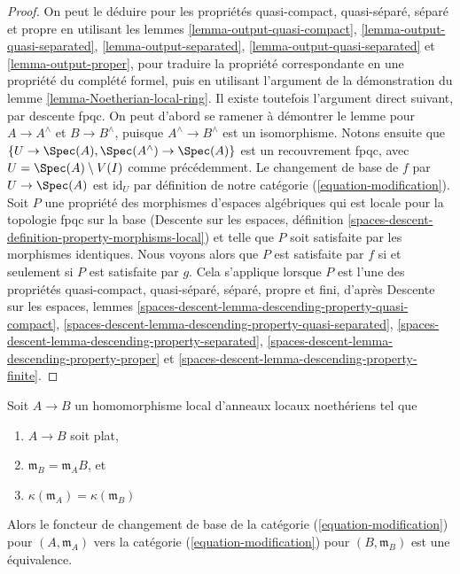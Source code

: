 \begin{proof}
On peut le déduire pour les propriétés
quasi-compact, quasi-séparé, séparé et propre
en utilisant les lemmes \ref{lemma-output-quasi-compact},
\ref{lemma-output-quasi-separated},
\ref{lemma-output-separated},
\ref{lemma-output-quasi-separated} et
\ref{lemma-output-proper},
pour traduire la propriété correspondante en une propriété du complété
formel, puis en utilisant l'argument de la démonstration du
lemme \ref{lemma-Noetherian-local-ring}.
Il existe toutefois l'argument direct suivant, par descente fpqc.
On peut d'abord se ramener à démontrer le lemme pour $A \to A^\wedge$
et $B \to B^\wedge$, puisque $A^\wedge  \to B^\wedge$ est un isomorphisme.
Notons ensuite que $\{U \to \Spec(A), \Spec(A^\wedge) \to \Spec(A)\}$ est un
recouvrement fpqc, avec $U = \Spec(A) \setminus V(I)$ comme précédemment.
Le changement de base de $f$ par $U \to \Spec(A)$ est $\text{id}_U$
par définition de notre catégorie (\ref{equation-modification}).
Soit $P$ une propriété des morphismes d'espaces algébriques qui est locale
pour la topologie fpqc sur la base (Descente sur les espaces, définition
\ref{spaces-descent-definition-property-morphisms-local})
et telle que $P$ soit satisfaite par les morphismes identiques.
Nous voyons alors que $P$ est satisfaite par $f$ si et seulement si $P$ est
satisfaite par $g$. Cela s'applique lorsque $P$ est l'une des propriétés
quasi-compact, quasi-séparé, séparé, propre et fini, d'après
Descente sur les espaces, lemmes
\ref{spaces-descent-lemma-descending-property-quasi-compact},
\ref{spaces-descent-lemma-descending-property-quasi-separated},
\ref{spaces-descent-lemma-descending-property-separated},
\ref{spaces-descent-lemma-descending-property-proper} et
\ref{spaces-descent-lemma-descending-property-finite}.
\end{proof}

\begin{lemma}
\label{lemma-equivalence-to-completion}
Soit $A \to B$ un homomorphisme local d'anneaux locaux noethériens tel que
\begin{enumerate}
\item $A \to B$ soit plat,
\item $\mathfrak m_B = \mathfrak m_A B$, et
\item $\kappa(\mathfrak m_A) = \kappa(\mathfrak m_B)$
\end{enumerate}
Alors le foncteur de changement de base de la catégorie
(\ref{equation-modification}) pour $(A, \mathfrak m_A)$ vers la catégorie
(\ref{equation-modification}) pour $(B, \mathfrak m_B)$
est une équivalence.
\end{lemma}


